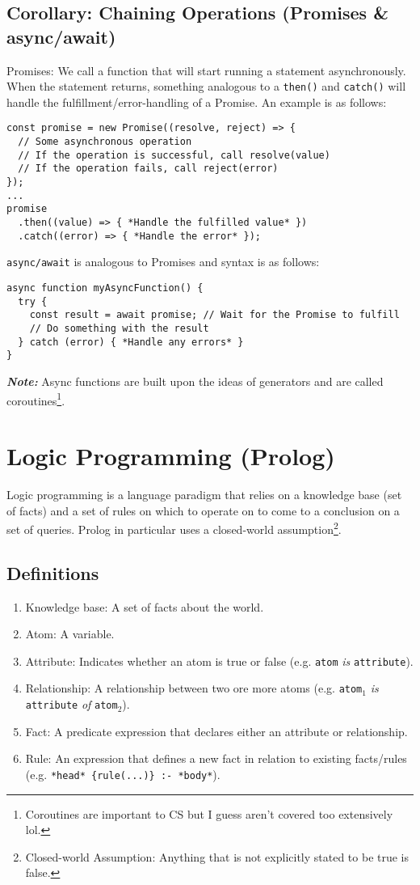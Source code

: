 \documentclass{article}
\begin{document}
\subsection*{Corollary: Chaining Operations (Promises \& async/await)}
Promises: We call a function that will start running a statement
asynchronously. When the statement returns, something analogous to a
\texttt{then()} and \texttt{catch()} will handle the
fulfillment/error-handling of a Promise. An example is as follows:
\begin{verbatim}
const promise = new Promise((resolve, reject) => {
  // Some asynchronous operation
  // If the operation is successful, call resolve(value)
  // If the operation fails, call reject(error)
});
...
promise
  .then((value) => { *Handle the fulfilled value* })
  .catch((error) => { *Handle the error* });
\end{verbatim}
\texttt{async/await} is analogous to Promises and syntax is as
follows:
\begin{verbatim}
async function myAsyncFunction() {
  try {
    const result = await promise; // Wait for the Promise to fulfill
    // Do something with the result
  } catch (error) { *Handle any errors* }
}
\end{verbatim}
\textit{\textbf{Note:}} Async functions are built upon the ideas of
generators and are called coroutines\footnote{Coroutines are important
  to CS but I guess aren't covered too extensively lol.}.




\section{Logic Programming (Prolog)}
Logic programming is a language paradigm that relies on a knowledge
base (set of facts) and a set of rules on which to operate on to come
to a conclusion on a set of queries. Prolog in particular uses a
closed-world assumption\footnote{Closed-world Assumption: Anything
  that is not explicitly stated to be true is false.}.

\subsection{Definitions}
\begin{enumerate}[label=(\roman*)]
\item Knowledge base: A set of facts about the world.
\item Atom: A variable.
\item Attribute: Indicates whether an atom is true or false
  (e.g. \texttt{atom} \textit{is} \texttt{attribute}).
\item Relationship: A relationship between two ore more atoms
  (e.g. \texttt{atom$_1$} \textit{is} \texttt{attribute} \textit{of} \texttt{atom$_2$}).
\item Fact: A predicate expression that declares either an attribute
  or relationship.
\item Rule: An expression that defines a new fact in relation to
  existing facts/rules (e.g. \texttt{*head* \{rule(...)\} :- *body*}).
\end{enumerate}
\end{document}
